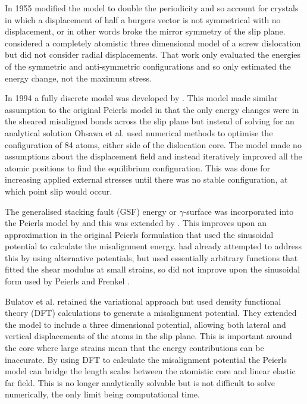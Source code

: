 In 1955 \citet{Huntington1955} modified the model to double the periodicity and so account for crystals in which a displacement of half a burgers vector is not symmetrical with no displacement, or in other words broke the mirror symmetry of the slip plane. 
\citet{Maradudin1959} considered a completely atomistic three dimensional model of a screw dislocation but did not consider radial displacements. That work only evaluated the energies of the symmetric and anti-symmetric configurations and so only estimated the energy change, not the maximum stress.



In 1994 a fully discrete model was developed by \citet{Ohsawa1994}. This model made similar assumption to the original Peierls model in that the only energy changes were in the sheared misaligned bonds across the slip plane but instead of solving for an analytical solution Ohsawa et al. used numerical methods to optimise the configuration of 84 atoms,  either side of the dislocation core. The model made no assumptions about the displacement field and instead iteratively improved all the atomic positions to find the equilibrium configuration. This was done for increasing applied external stresses until there was no stable configuration, at which point slip would occur.




The generalised stacking fault (GSF) energy or $\gamma$-surface was incorporated into the Peierls model by \citet{Vitek1992} and this was extended by \citet{Bulatov1997}. This improves upon an approximation in the original Peierls formulation that used the sinusoidal potential to calculate the misalignment energy. \citet{Ohsawa1994} had already attempted to address this by using alternative potentials, but used essentially arbitrary functions that fitted the shear modulus at small strains, so did not improve upon the sinusoidal form used by Peierls and Frenkel \cite{Peierls1940,Frenkel1926}. 

Bulatov et al. retained the variational approach but used density functional theory (DFT) calculations to generate a misalignment potential. They extended the model to include a three dimensional potential, allowing both lateral and vertical displacements of the atoms in the slip plane. This is important around the core where large strains mean that the energy contributions can be inaccurate. By using DFT to calculate the misalignment potential the Peierls model can bridge the length scales between the atomistic core and linear elastic far field. This is no longer analytically solvable but is not difficult to solve numerically, the only limit being computational time.

